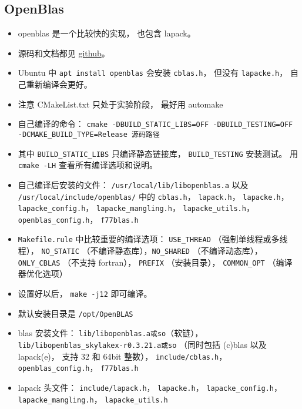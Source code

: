 \subsection{OpenBlas}
\begin{itemize}
\item openblas 是一个比较快的实现， 也包含 lapack。
\item 源码和文档都见 \href{https://github.com/xianyi/OpenBLAS}{github}。
\item Ubuntu 中 \verb|apt install openblas| 会安装 \verb|cblas.h|， 但没有 \verb|lapacke.h|， 自己重新编译会更好。
\item 注意 CMakeList.txt 只处于实验阶段， 最好用 automake
\item 自己编译的命令： \verb|cmake -DBUILD_STATIC_LIBS=OFF -DBUILD_TESTING=OFF -DCMAKE_BUILD_TYPE=Release 源码路径|
\item 其中 \verb|BUILD_STATIC_LIBS| 只编译静态链接库， \verb|BUILD_TESTING| 安装测试。 用 \verb|cmake -LH| 查看所有编译选项和说明。
\item 自己编译后安装的文件： \verb|/usr/local/lib/libopenblas.a| 以及 \verb|/usr/local/include/openblas/| 中的 \verb|cblas.h|， \verb|lapack.h|， \verb|lapacke.h|， \verb|lapacke_config.h|， \verb|lapacke_mangling.h|， \verb|lapacke_utils.h|， \verb|openblas_config.h|， \verb|f77blas.h|
\item \verb|Makefile.rule| 中比较重要的编译选项： \verb|USE_THREAD| （强制单线程或多线程）， \verb|NO_STATIC| （不编译静态库），\verb|NO_SHARED| （不编译动态库）， \verb|ONLY_CBLAS| （不支持 fortran）， \verb|PREFIX| （安装目录）， \verb|COMMON_OPT| （编译器优化选项）
\item 设置好以后， \verb|make -j12| 即可编译。
\item 默认安装目录是 \verb|/opt/OpenBLAS|
\item blas 安装文件： \verb|lib/libopenblas.a或so|（软链）， \verb|lib/libopenblas_skylakex-r0.3.21.a或so| （同时包括 (c)blas 以及 lapack(e)， 支持 32 和 64bit 整数）， \verb|include/cblas.h|， \verb|openblas_config.h|， \verb|f77blas.h|
\item lapack 头文件： \verb|include/lapack.h|， \verb|lapacke.h|， \verb|lapacke_config.h|， \verb|lapacke_mangling.h|， \verb|lapacke_utils.h|
\end{itemize}
